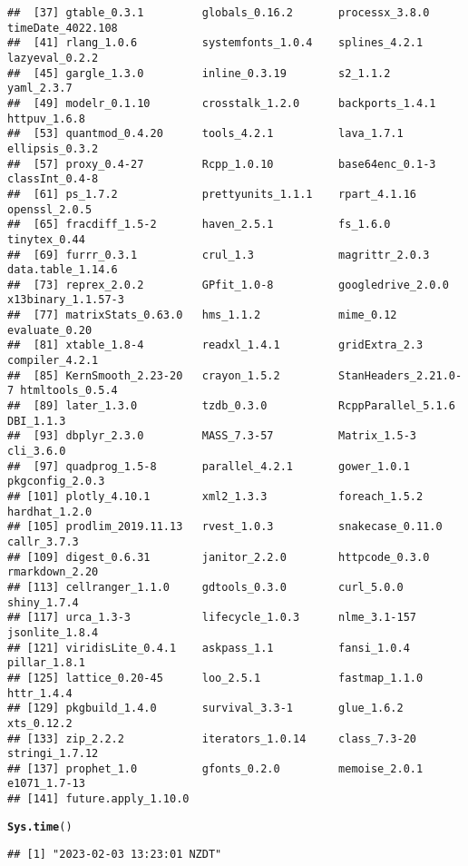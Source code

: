 \documentclass{article}\usepackage[]{graphicx}\usepackage[]{xcolor}
\makeatletter
\newcommand{\hlstd}[1]{\textcolor[rgb]{0.345,0.345,0.345}{#1}}%
\newcommand{\hlkwd}[1]{\textcolor[rgb]{0.737,0.353,0.396}{\textbf{#1}}}%
\newenvironment{kframe}{%
 \def\at@end@of@kframe{}%
 \ifinner\ifhmode%
  \def\at@end@of@kframe{\end{minipage}}%
  \begin{minipage}{\columnwidth}%
 \fi\fi%
 \def\FrameCommand##1{\hskip\@totalleftmargin \hskip-\fboxsep
 \colorbox{shadecolor}{##1}\hskip-\fboxsep
     \hskip-\linewidth \hskip-\@totalleftmargin \hskip\columnwidth}%
 \MakeFramed {\advance\hsize-\width
   \@totalleftmargin\z@ \linewidth\hsize
   \@setminipage}}%
 {\par\unskip\endMakeFramed%
 \at@end@of@kframe}
\newenvironment{knitrout}{}{} %
\makeatother
\begin{document}
\begin{knitrout}
\begin{kframe}
\begin{verbatim}
##  [37] gtable_0.3.1         globals_0.16.2       processx_3.8.0       timeDate_4022.108   
##  [41] rlang_1.0.6          systemfonts_1.0.4    splines_4.2.1        lazyeval_0.2.2      
##  [45] gargle_1.3.0         inline_0.3.19        s2_1.1.2             yaml_2.3.7          
##  [49] modelr_0.1.10        crosstalk_1.2.0      backports_1.4.1      httpuv_1.6.8        
##  [53] quantmod_0.4.20      tools_4.2.1          lava_1.7.1           ellipsis_0.3.2      
##  [57] proxy_0.4-27         Rcpp_1.0.10          base64enc_0.1-3      classInt_0.4-8      
##  [61] ps_1.7.2             prettyunits_1.1.1    rpart_4.1.16         openssl_2.0.5       
##  [65] fracdiff_1.5-2       haven_2.5.1          fs_1.6.0             tinytex_0.44        
##  [69] furrr_0.3.1          crul_1.3             magrittr_2.0.3       data.table_1.14.6   
##  [73] reprex_2.0.2         GPfit_1.0-8          googledrive_2.0.0    x13binary_1.1.57-3  
##  [77] matrixStats_0.63.0   hms_1.1.2            mime_0.12            evaluate_0.20       
##  [81] xtable_1.8-4         readxl_1.4.1         gridExtra_2.3        compiler_4.2.1      
##  [85] KernSmooth_2.23-20   crayon_1.5.2         StanHeaders_2.21.0-7 htmltools_0.5.4     
##  [89] later_1.3.0          tzdb_0.3.0           RcppParallel_5.1.6   DBI_1.1.3           
##  [93] dbplyr_2.3.0         MASS_7.3-57          Matrix_1.5-3         cli_3.6.0           
##  [97] quadprog_1.5-8       parallel_4.2.1       gower_1.0.1          pkgconfig_2.0.3     
## [101] plotly_4.10.1        xml2_1.3.3           foreach_1.5.2        hardhat_1.2.0       
## [105] prodlim_2019.11.13   rvest_1.0.3          snakecase_0.11.0     callr_3.7.3         
## [109] digest_0.6.31        janitor_2.2.0        httpcode_0.3.0       rmarkdown_2.20      
## [113] cellranger_1.1.0     gdtools_0.3.0        curl_5.0.0           shiny_1.7.4         
## [117] urca_1.3-3           lifecycle_1.0.3      nlme_3.1-157         jsonlite_1.8.4      
## [121] viridisLite_0.4.1    askpass_1.1          fansi_1.0.4          pillar_1.8.1        
## [125] lattice_0.20-45      loo_2.5.1            fastmap_1.1.0        httr_1.4.4          
## [129] pkgbuild_1.4.0       survival_3.3-1       glue_1.6.2           xts_0.12.2          
## [133] zip_2.2.2            iterators_1.0.14     class_7.3-20         stringi_1.7.12      
## [137] prophet_1.0          gfonts_0.2.0         memoise_2.0.1        e1071_1.7-13        
## [141] future.apply_1.10.0
\end{verbatim}
\begin{alltt}
\hlkwd{Sys.time}\hlstd{()}
\end{alltt}
\begin{verbatim}
## [1] "2023-02-03 13:23:01 NZDT"
\end{verbatim}
\end{kframe}
\end{knitrout}
\end{document}

